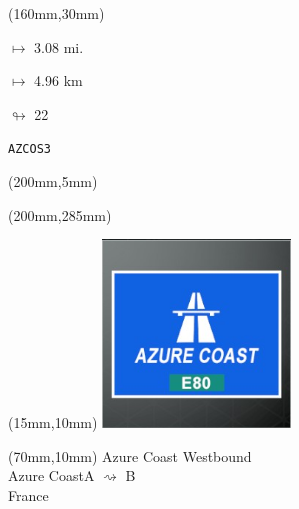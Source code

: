 \begin{textblock*}{40mm}(160mm,30mm)%
\Large
\par$\mapsto$ 3.08 mi.
\par$\mapsto$ 4.96 km
\par$\looparrowright$ 22
\par\hfill\tiny\tt AZCOS3\\
\end{textblock*}
\begin{textblock*}{20mm}(200mm,5mm)%
\fbox{\thepage}
\label{AZCOS3}
\end{textblock*}
\begin{textblock*}{20mm}(200mm,285mm)%
\fbox{\thepage}
\end{textblock*}

\null\newpage
\begin{textblock*}{50mm}(15mm,10mm)%
\includegraphics[width=50mm]{LG/2015-05-20_00073.png}
\end{textblock*}
\begin{textblock*}{130mm}(70mm,10mm)%
{\fontsize{20}{20}\selectfont Azure Coast Westbound\\}
{\fontsize{16}{16}\selectfont Azure Coast\hfill A $\rightsquigarrow$ B\\}
{\fontsize{12}{12}\selectfont France\\}
\end{textblock*}
